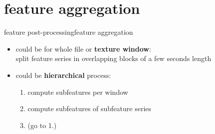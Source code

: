     \section[aggregation]{feature aggregation}
		\begin{frame}{feature post-processing}{feature aggregation}
            \begin{itemize}
                \item       could be for whole file or \textbf{texture window}:\\ split feature series in overlapping blocks of a few seconds length
                \bigskip
                \item<2->   could be \textbf{hierarchical} process:
                    \begin{enumerate}
                        \item   compute subfeatures per window
                        \item   compute subfeatures of subfeature series
                        \item   (go to 1.)
                    \end{enumerate}
            \end{itemize}
		\end{frame}

